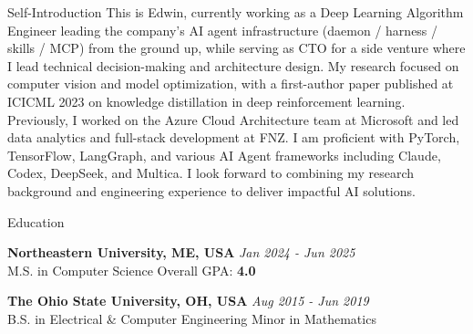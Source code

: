 \documentclass{resume} %
\begin{document}

\begin{rSection}{Self-Introduction}
    This is Edwin, currently working as a Deep Learning Algorithm Engineer leading the company's AI agent infrastructure (daemon / harness / skills / MCP) from the ground up, while serving as CTO for a side venture where I lead technical decision-making and architecture design. My research focused on computer vision and model optimization, with a first-author paper published at ICICML 2023 on knowledge distillation in deep reinforcement learning. Previously, I worked on the Azure Cloud Architecture team at Microsoft and led data analytics and full-stack development at FNZ. I am proficient with PyTorch, TensorFlow, LangGraph, and various AI Agent frameworks including Claude, Codex, DeepSeek, and Multica. I look forward to combining my research background and engineering experience to deliver impactful AI solutions.
\end{rSection}


\begin{rSection}{Education}

    {\bf Northeastern University, ME, USA} \hfill {\em Jan 2024 - Jun 2025} \\
    M.S. in Computer Science \hfill Overall GPA: \textbf {4.0}

    {\bf The Ohio State University, OH, USA} \hfill {\em Aug 2015 - Jun 2019} \\
    B.S. in Electrical \& Computer Engineering \hfill Minor in Mathematics

\end{rSection}

\end{document}
